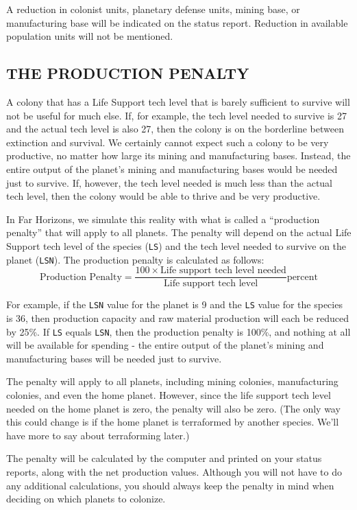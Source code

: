 \documentclass[10pt,titlepage]{article}
\begin{document}
A reduction in colonist units, planetary defense units, mining base, or
manufacturing base will be indicated on the status report.  Reduction in
available population units will not be mentioned.

\subsection{THE PRODUCTION PENALTY}
\label{sec:productionpenalty}

A colony that has a Life Support tech level that is barely sufficient to
survive will not be useful for much else.  If, for example, the tech level
needed to survive is 27 and the actual tech level is also 27, then the colony
is on the borderline between extinction and survival.  We certainly cannot
expect such a colony to be very productive, no matter how large its mining and
manufacturing bases.  Instead, the entire output of the planet's mining and
manufacturing bases would be needed just to survive.  If, however, the tech
level needed is much less than the actual tech level, then the colony would
be able to thrive and be very productive.

In Far Horizons, we simulate this reality with what is called a ``production
penalty'' that will apply to all planets.  The penalty will depend on the actual
Life Support tech level of the species (\texttt{LS}) and the tech level needed to
survive on the planet (\texttt{LSN}).  The production penalty is calculated as follows:
\[
\textrm{Production Penalty}  =  \dfrac{100  \times  \textrm{Life support tech level needed}}{\textrm{Life support tech level}}\textrm{percent}
\]

For example, if the \texttt{LSN} value for the planet is 9 and the \texttt{LS} value for the
species is 36, then production capacity and raw material production will each
be reduced by 25\%.  If \texttt{LS} equals \texttt{LSN}, then the production penalty is 100\%,
and nothing at all will be available for spending - the entire output of the
planet's mining and manufacturing bases will be needed just to survive.

The penalty will apply to all planets, including mining colonies, manufacturing
colonies, and even the home planet.  However, since the life support tech level
needed on the home planet is zero, the penalty will also be zero.  (The only
way this could change is if the home planet is terraformed by another species.
We'll have more to say about terraforming later.)

The penalty will be calculated by the computer and printed on your status
reports, along with the net production values.  Although you will not have to
do any additional calculations, you should always keep the penalty in mind when
deciding on which planets to colonize.
\end{document}
